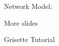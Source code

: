 \documentclass[aspectratio=169]{beamer}
\begin{document}
\begin{hidden}
\begin{frame}{Network Model:}
\begin{tikzpicture}

\end{tikzpicture}
\end{frame}

\begin{frame}
\centering
\LARGE More slides
\end{frame}

\begin{frame}{Grisette Tutorial}
\end{frame}
\end{hidden}
\end{document}
